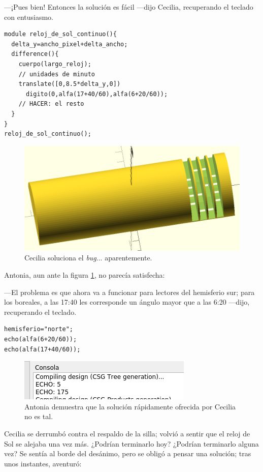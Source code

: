 ---¡Pues bien! Entonces la solución es fácil ---dijo Cecilia,
recuperando el teclado con entusiasmo.

\begin{lstlisting}
module reloj_de_sol_continuo(){
  delta_y=ancho_pixel+delta_ancho;
  difference(){
    cuerpo(largo_reloj);    
    // unidades de minuto
    translate([0,8.5*delta_y,0])
      digito(0,alfa(17+40/60),alfa(6+20/60));
    // HACER: el resto
  }
}
reloj_de_sol_continuo();
\end{lstlisting}%

\begin{figure}[ht]
  \centering
  \includegraphics[width=.75\textwidth]{imagenes/unidades-minutos}  
  \caption{Cecilia soluciona el \emph{bug}... aparentemente.}
  \label{fig:unidades-minutos}
\end{figure}

Antonia, aun ante la figura \ref{fig:unidades-minutos}, no parecía
satisfecha:

---El problema es que ahora va a funcionar para lectores del
hemisferio sur; para los boreales, a las 17:40 les corresponde un
ángulo mayor que a las 6:20 ---dijo, recuperando el teclado.

\begin{lstlisting}
hemisferio="norte";
echo(alfa(6+20/60));
echo(alfa(17+40/60));
\end{lstlisting}%

\begin{figure}[ht]
  \centering
  \includegraphics[width=.6\textwidth]{imagenes/unidades-minutos-bug-6}
  \caption{Antonia demuestra que la solución rápidamente ofrecida por
    Cecilia no es tal.}
  \label{fig:unidades-minutos-bug-6}
\end{figure}


Cecilia se derrumbó contra el respaldo de la silla; volvió a sentir
que el reloj de Sol se alejaba una vez más. ¿Podrían terminarlo hoy?
¿Podrían terminarlo alguna vez? Se sentía al borde del desánimo, pero
se obligó a pensar una solución; tras unos instantes, aventuró:

